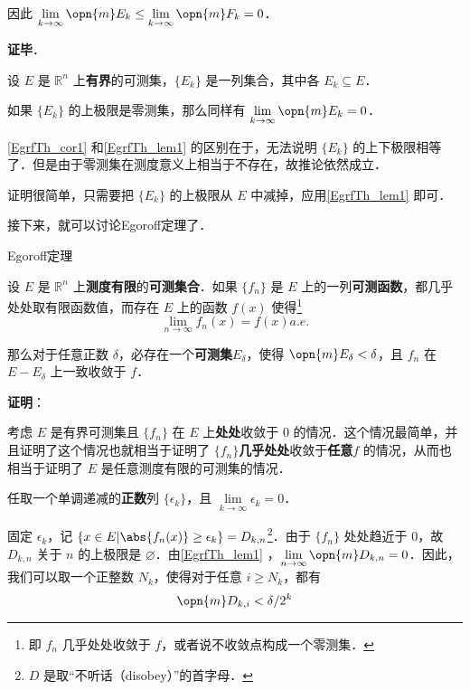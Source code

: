 因此 $\lim\limits_{k\to\infty}\opn{m}E_k\leq\lim\limits_{k\to\infty}\opn{m}F_k=0$．


\textbf{证毕}．

\begin{corollary}{}\label{EgrfTh_cor1}
设 $E$ 是 $\mathbb{R}^n$ 上\textbf{有界}的可测集，$\{E_k\}$ 是一列集合，其中各 $E_k\subseteq E$．

如果 $\{E_k\}$ 的上极限是零测集，那么同样有 $\lim\limits_{k\to\infty}\opn{m}E_k=0$．
\end{corollary}

\autoref{EgrfTh_cor1} 和\autoref{EgrfTh_lem1} 的区别在于，无法说明 $\{E_k\}$ 的上下极限相等了．但是由于零测集在测度意义上相当于不存在，故推论依然成立．

证明很简单，只需要把 $\{E_k\}$ 的上极限从 $E$ 中减掉，应用\autoref{EgrfTh_lem1} 即可．





接下来，就可以讨论Egoroff定理了．


\begin{theorem}{Egoroff定理}\label{EgrfTh_the1}

设 $E$ 是 $\mathbb{R}^n$ 上\textbf{测度有限}的\textbf{可测集合}．如果 $\{f_n\}$ 是 $E$ 上的一列\textbf{可测函数}，都几乎处处取有限函数值，而存在 $E$ 上的函数 $f(x)$ 使得\footnote{即 $f_n$ 几乎处处收敛于 $f$，或者说不收敛点构成一个零测集．}\begin{equation}
\lim\limits_{n\to\infty}f_n(x)=f(x)a. e. 
\end{equation}

那么对于任意正数 $\delta$，必存在一个\textbf{可测集}$E_\delta$，使得 $\opn{m}E_\delta<\delta$，且 $f_n$ 在 $E-E_\delta$ 上一致收敛于 $f$．

\end{theorem}

\textbf{证明}：

考虑 $E$ 是有界可测集且 $\{f_n\}$ 在 $E$ 上\textbf{处处}收敛于 $0$ 的情况．这个情况最简单，并且证明了这个情况也就相当于证明了 $\{f_n\}$\textbf{几乎处处}收敛于\textbf{任意}$f$ 的情况，从而也相当于证明了 $E$ 是任意测度有限的可测集的情况．



任取一个单调递减的\textbf{正数}列 $\{\epsilon_k\}$，且 $\lim\limits_{k\to\infty}\epsilon_k=0$．

固定 $\epsilon_k$，记 $\{x\in E|\abs{f_n(x)}\geq\epsilon_k\}=D_{k, n}$\footnote{$D$ 是取“不听话（disobey）”的首字母．}．由于 $\{f_n\}$ 处处趋近于 $0$，故 $D_{k, n}$ 关于 $n$ 的上极限是 $\varnothing$．由\autoref{EgrfTh_lem1} ，$\lim\limits_{n\to\infty}\opn{m}D_{k, n}=0$．因此，我们可以取一个正整数 $N_k$，使得对于任意 $i\geq N_k$，都有
\begin{equation}\label{EgrfTh_eq2}
\opn{m}D_{k, i}<\delta/2^k
\end{equation}

